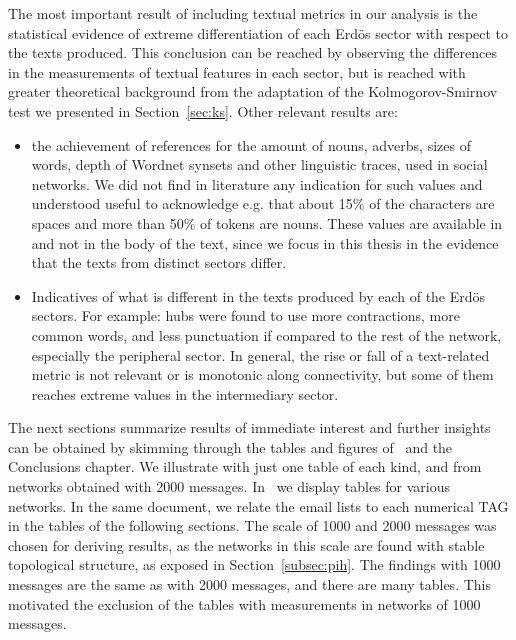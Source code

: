 The most important result of including textual metrics in our analysis is the
statistical evidence of extreme differentiation of each Erd\"os sector with respect to the texts produced.
This conclusion can be reached by observing the differences in the measurements of textual features in
each sector, but is reached with greater theoretical background from the adaptation of the
Kolmogorov-Smirnov test we presented in Section~\ref{sec:ks}.
Other relevant results are:
\begin{itemize}
	\item the achievement of references for the amount of nouns, adverbs, sizes of words, depth of Wordnet synsets and other linguistic traces, used in social networks.
		We did not find in literature any indication for such values and understood useful to acknowledge e.g. that about 15\% of the characters are spaces and more than 50\% of tokens are nouns.
		These values are available in~\cite{textTables} and not in the body of the text,
		since we focus in this thesis in the evidence that the texts from distinct sectors differ.
	\item Indicatives of what is different in the texts produced by each of the Erd\"os sectors.
		For example: hubs were found to use more contractions,
		more common words, and less punctuation if compared to the rest of the network,
		especially the peripheral sector.
		In general, the rise or fall of a text-related metric is not relevant or is monotonic along connectivity,
		but some of them reaches extreme values in the intermediary sector.
\end{itemize}

The next sections summarize results of immediate interest
and further insights can be obtained by skimming through
the tables and figures of~\cite{stab,textTables} and the Conclusions chapter.
We illustrate with just one table of each kind,
and from networks obtained with 2000 messages.
In~\cite{textTables} we display tables for various networks.
In the same document, we relate the email lists to each numerical
TAG in the tables of the following sections.
The scale of 1000 and 2000 messages was chosen for deriving results,
as the networks in this scale are found with stable topological structure,
as exposed in Section~\ref{subsec:pih}.
The findings with 1000 messages are the same as with 2000 messages,
and there are many tables.
This motivated the exclusion of the tables with measurements in
networks of 1000 messages.

